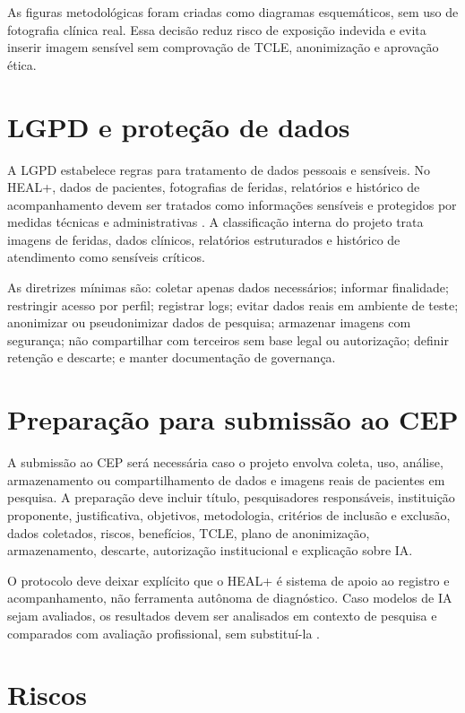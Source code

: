 \documentclass[
    12pt,
    oneside,
    a4paper,
    chapter=TITLE,
    brazil,
    sumario=tradicional,
    hidelinks
]{abntex2}
\begin{document}
As figuras metodológicas foram criadas como diagramas esquemáticos, sem uso de fotografia clínica real. Essa decisão reduz risco de exposição indevida e evita inserir imagem sensível sem comprovação de TCLE, anonimização e aprovação ética.

\chapter{LGPD e proteção de dados}

A LGPD estabelece regras para tratamento de dados pessoais e sensíveis. No HEAL+, dados de pacientes, fotografias de feridas, relatórios e histórico de acompanhamento devem ser tratados como informações sensíveis e protegidos por medidas técnicas e administrativas \cite{brasil2018,anpd2023}. A classificação interna do projeto trata imagens de feridas, dados clínicos, relatórios estruturados e histórico de atendimento como sensíveis críticos.

As diretrizes mínimas são: coletar apenas dados necessários; informar finalidade; restringir acesso por perfil; registrar logs; evitar dados reais em ambiente de teste; anonimizar ou pseudonimizar dados de pesquisa; armazenar imagens com segurança; não compartilhar com terceiros sem base legal ou autorização; definir retenção e descarte; e manter documentação de governança.

\chapter{Preparação para submissão ao CEP}

A submissão ao CEP será necessária caso o projeto envolva coleta, uso, análise, armazenamento ou compartilhamento de dados e imagens reais de pacientes em pesquisa. A preparação deve incluir título, pesquisadores responsáveis, instituição proponente, justificativa, objetivos, metodologia, critérios de inclusão e exclusão, dados coletados, riscos, benefícios, TCLE, plano de anonimização, armazenamento, descarte, autorização institucional e explicação sobre IA.

O protocolo deve deixar explícito que o HEAL+ é sistema de apoio ao registro e acompanhamento, não ferramenta autônoma de diagnóstico. Caso modelos de IA sejam avaliados, os resultados devem ser analisados em contexto de pesquisa e comparados com avaliação profissional, sem substituí-la \cite{who2021,who2023,brasil2012}.

\chapter{Riscos}
\end{document}
